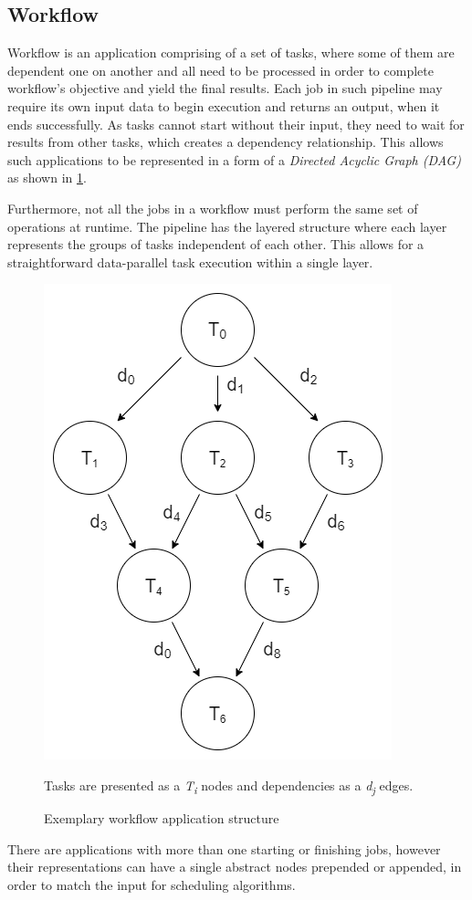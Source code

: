 \subsection{Workflow}
\label{s:ProblemDomain:Workflow}

Workflow is an application comprising of a set of tasks, where some of them are dependent one on another and all need to be processed in order to complete workflow's objective and yield the final results.
Each job in such pipeline may require its own input data to begin execution and returns an output, when it ends successfully.
As tasks cannot start without their input, they need to wait for results from other tasks, which creates a dependency relationship.
This allows such applications to be represented in a form of a \emph{Directed Acyclic Graph (DAG)} as shown in \cref{fig:workflow:dag-example}.

Furthermore, not all the jobs in a workflow must perform the same set of operations at runtime.
The pipeline has the layered structure where each layer represents the groups of tasks independent of each other.
This allows for a straightforward data-parallel task execution within a single layer. 


\begin{figure}[H]
\centering
\includegraphics[width=0.3\linewidth]{figures/2-3-dag-example-with-d.png}
\caption{Exemplary workflow application structure}
\label{fig:workflow:dag-example}

\smallskip
\begin{minipage}{0.6\textwidth}
{\footnotesize
Tasks are presented as a \emph{T\textsubscript{i}} nodes and dependencies as a \emph{d\textsubscript{j}} edges. 
\par}
\end{minipage}

\end{figure}


There are applications with more than one starting or finishing jobs, however their representations can have a single abstract nodes prepended or appended, in order to match the input for scheduling algorithms.



